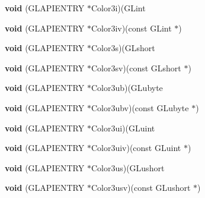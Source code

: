 \begin{DoxyCompactItemize}
{\bfseries void} (G\+L\+A\+P\+I\+E\+N\+T\+RY $\ast$Color3i)(G\+Lint
\item 
\mbox{\label{struct_____g_ldispatch_table_rec_ab3baf892ba2e9f30edbecc979feb853a}} 
{\bfseries void} (G\+L\+A\+P\+I\+E\+N\+T\+RY $\ast$Color3iv)(const G\+Lint $\ast$)
\item 
\mbox{\label{struct_____g_ldispatch_table_rec_a6d4a8aee85683ec374b335e47de3ee4e}} 
{\bfseries void} (G\+L\+A\+P\+I\+E\+N\+T\+RY $\ast$Color3s)(G\+Lshort
\item 
\mbox{\label{struct_____g_ldispatch_table_rec_ac4561ba06e070e8f0b70be18c0484b21}} 
{\bfseries void} (G\+L\+A\+P\+I\+E\+N\+T\+RY $\ast$Color3sv)(const G\+Lshort $\ast$)
\item 
\mbox{\label{struct_____g_ldispatch_table_rec_ac418e1a80122464b6f54a1ebcc353b36}} 
{\bfseries void} (G\+L\+A\+P\+I\+E\+N\+T\+RY $\ast$Color3ub)(G\+Lubyte
\item 
\mbox{\label{struct_____g_ldispatch_table_rec_a86b82af1d372d3de4f795298afef1952}} 
{\bfseries void} (G\+L\+A\+P\+I\+E\+N\+T\+RY $\ast$Color3ubv)(const G\+Lubyte $\ast$)
\item 
\mbox{\label{struct_____g_ldispatch_table_rec_aa81b6f04ddcf9e0e07d8718ebee8c173}} 
{\bfseries void} (G\+L\+A\+P\+I\+E\+N\+T\+RY $\ast$Color3ui)(G\+Luint
\item 
\mbox{\label{struct_____g_ldispatch_table_rec_af566c856709ba3bef140923f542fd5b8}} 
{\bfseries void} (G\+L\+A\+P\+I\+E\+N\+T\+RY $\ast$Color3uiv)(const G\+Luint $\ast$)
\item 
\mbox{\label{struct_____g_ldispatch_table_rec_abf5cea8392edecc8199fc804d57ca650}} 
{\bfseries void} (G\+L\+A\+P\+I\+E\+N\+T\+RY $\ast$Color3us)(G\+Lushort
\item 
\mbox{\label{struct_____g_ldispatch_table_rec_a948f09e1761e68e99a6af7e45c877a40}} 
{\bfseries void} (G\+L\+A\+P\+I\+E\+N\+T\+RY $\ast$Color3usv)(const G\+Lushort $\ast$)

\end{DoxyCompactItemize}
